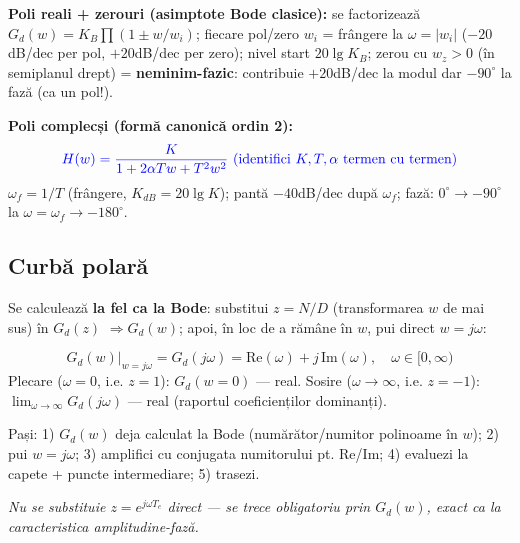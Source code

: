 \documentclass[8.2pt,a4paper,twocolumn]{extarticle}
\begin{document}
\textbf{Poli reali + zerouri (asimptote Bode clasice):} se factorizează $G_d(w)=K_B\prod(1\pm w/w_i)$; fiecare pol/zero $w_i$ = frângere la $\omega=|w_i|$ ($-20$dB/dec per pol, $+20$dB/dec per zero); nivel start $20\lg K_B$; zerou cu $w_z>0$ (în semiplanul drept) = \textbf{neminim-fazic}: contribuie $+20$dB/dec la modul dar $-90^\circ$ la fază (ca un pol!).

\textbf{Poli complecși (formă canonică ordin 2):}
$$\color{blue}H(w)=\frac{K}{1+2\alpha Tw+T^2w^2}\ (\text{identifici }K,T,\alpha\text{ termen cu termen})$$
$\omega_f=1/T$ (frângere, $K_{dB}=20\lg K$); pantă $-40$dB/dec după $\omega_f$; fază: $0^\circ\to-90^\circ$ la $\omega=\omega_f\to-180^\circ$.

\subsection*{Curbă polară}
Se calculează \textbf{la fel ca la Bode}: substitui $z=N/D$ (transformarea $w$ de mai sus) în $G_d(z)$ $\Rightarrow G_d(w)$; apoi, în loc de a rămâne în $w$, pui direct $w=j\omega$:
\begin{res}
$$G_d(w)\big|_{w=j\omega}=G_d(j\omega)=\text{Re}(\omega)+j\,\text{Im}(\omega),\quad \omega\in[0,\infty)$$
Plecare ($\omega=0$, i.e. $z=1$): $G_d(w{=}0)$ --- real. Sosire ($\omega\to\infty$, i.e. $z=-1$): $\displaystyle\lim_{\omega\to\infty}G_d(j\omega)$ --- real (raportul coeficienților dominanți).
\end{res}
Pași: 1) $G_d(w)$ deja calculat la Bode (numărător/numitor polinoame în $w$); 2) pui $w=j\omega$; 3) amplifici cu conjugata numitorului pt. Re/Im; 4) evaluezi la capete + puncte intermediare; 5) trasezi.

\textit{Nu se substituie $z=e^{j\omega T_e}$ direct --- se trece obligatoriu prin $G_d(w)$, exact ca la caracteristica amplitudine-fază.}
\end{document}
